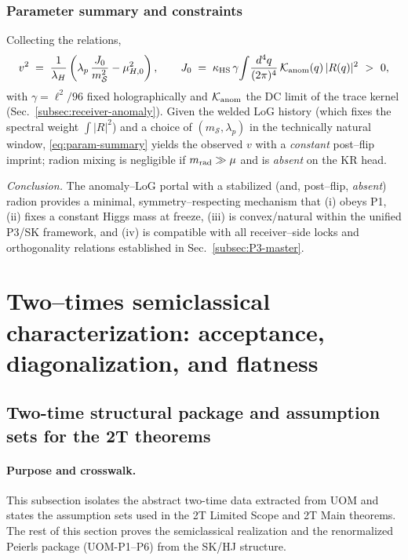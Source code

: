 \documentclass[10pt]{article}
\theoremstyle{definition}
\theoremstyle{plain}
\begin{document}
\subsubsection*{Parameter summary and constraints}\label{subsubsec:uom-main-015}
Collecting the relations,
\begin{equation}
\label{eq:param-summary}
v^2\;=\;\frac{1}{\lambda_H}\left(\lambda_p\,\frac{J_0}{m_{\mathcal S}^2}-\mu_{H,0}^2\right),
\qquad
J_0\;=\;\kappa_{\rm HS}\,\gamma\!\int\!\frac{d^4q}{(2\pi)^4}\,\mathcal K_{\rm anom}(q)\,|R(q)|^2\ >\ 0,
\end{equation}
with $\gamma=\ell^2/96$ fixed holographically and $\mathcal K_{\rm anom}$ the DC limit of the trace
kernel (Sec.~\ref{subsec:receiver-anomaly}). Given the welded LoG history (which fixes the spectral
weight $\int|R|^2$) and a choice of $(m_{\mathcal S},\lambda_p)$ in the technically natural window,
\eqref{eq:param-summary} yields the observed $v$ with a \emph{constant} post–flip imprint; radion
mixing is negligible if $m_{\rm rad}\gg \mu$ and is \emph{absent} on the KR head.

\medskip
\noindent\emph{Conclusion.} The anomaly–LoG portal with a stabilized (and, post–flip, \emph{absent})
radion provides a minimal, symmetry–respecting mechanism that (i) obeys P1, (ii) fixes a constant Higgs
mass at freeze, (iii) is convex/natural within the unified P3/SK framework, and (iv) is compatible with
all receiver–side locks and orthogonality relations established in Sec.~\ref{subsec:P3-master}.

\section{Two--times semiclassical characterization: acceptance, diagonalization, and flatness}
\label{sec:two-times-semiclassical}

\subsection{Two-time structural package and assumption sets for the 2T theorems}
\label{subsec:two-times-assumptions}

\paragraph{Purpose and crosswalk.}
This subsection isolates the abstract two-time data extracted from UOM and states the assumption sets used in the
2T Limited Scope and 2T Main theorems. The rest of this section proves the semiclassical realization and the
renormalized Peierls package (UOM-P1--P6) from the SK/HJ structure.
\end{document}

